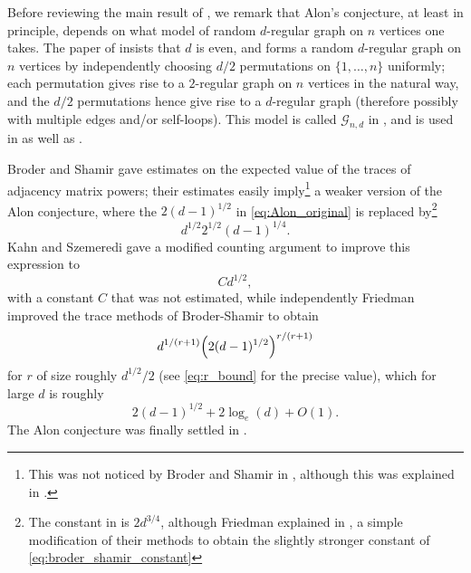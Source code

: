 \documentclass{memo-l}
\theoremstyle{plain}
\theoremstyle{definition}
\numberwithin{section}{chapter}
\numberwithin{equation}{chapter}
\theoremstyle{plain}
\theoremstyle{definition}
\newcommand\cG{\mathcal{G}}
\begin{document}
Before reviewing the main result of \cite{friedman_alon}, we remark
that Alon's conjecture, at least in principle, depends on what model
of random $d$-regular graph on $n$ vertices one takes.
The paper of \cite{broder} insists that $d$ is even, and forms a
random $d$-regular graph on $n$ vertices by independently
choosing $d/2$ permutations
on $\{1,\ldots,n\}$ uniformly; each permutation gives rise to a 
$2$-regular graph 
on $n$ vertices in the natural way, and the $d/2$ permutations
hence give rise to a $d$-regular graph
(therefore possibly with multiple edges and/or
self-loops).
This model is called $\cG_{n,d}$ in \cite{friedman_alon}, and is
used in \cite{friedman_kahn_szemeredi,friedman_random_graphs}
as well as \cite{broder,friedman_alon}.

Broder and Shamir \cite{broder} gave estimates on the expected value
of the traces of adjacency matrix powers; 
their estimates easily imply\footnote{This was not noticed by
Broder and Shamir in \cite{broder}, although this was explained
in \cite{friedman_kahn_szemeredi,friedman_random_graphs}.}
a weaker version of the Alon conjecture,
where the $2(d-1)^{1/2}$ in \eqref{eq:Alon_original} is replaced 
by\footnote{The constant in \cite{broder} is $2d^{3/4}$, although
Friedman explained in
\cite{friedman_kahn_szemeredi,friedman_random_graphs},
a simple modification of their methods to
obtain the slightly stronger constant of \eqref{eq:broder_shamir_constant}}
\begin{equation}\label{eq:broder_shamir_constant}
d^{1/2} 2^{1/2}(d-1)^{1/4} .
\end{equation}
Kahn and Szemeredi 
\cite{friedman_kahn_szemeredi}
gave a modified counting argument to improve this
expression to
$$
C d^{1/2},
$$
with a constant $C$ that was not estimated, while independently
Friedman 
\cite{friedman_kahn_szemeredi,friedman_random_graphs} improved the
trace methods of Broder-Shamir to obtain
$$
d^{1/(r+1)} \Bigl( 2(d-1)^{1/2} \Bigr)^{r/(r+1)}
$$
for $r$ of size roughly $d^{1/2}/2$ (see \eqref{eq:r_bound} for the
precise value), which
for large $d$ is roughly
$$
2(d-1)^{1/2} + 2\log_e(d) + O(1).
$$
The Alon conjecture was finally settled in \cite{friedman_alon}.
\end{document}
